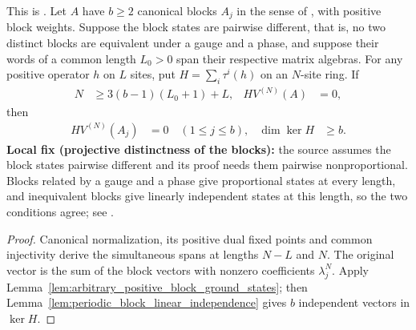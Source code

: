 \begin{theorem}
    \label{thm:canonical_arbitrary_interaction_degeneracy}
    \leanok
    This is \cite[Theorem~11]{PerezGarcia2007Matrix}. Let $A$ have $b\ge2$
    canonical blocks $A_j$ in the sense of
    \cite[Theorem~4]{PerezGarcia2007Matrix}, with positive block weights.
    Suppose the block states are pairwise different, that is, no two distinct
    blocks are equivalent under a gauge and a phase, and suppose their words of
    a common length $L_0>0$ span their respective matrix algebras. For any
    positive operator $h$ on $L$ sites, put
    $H=\sum_i\tau^i(h)$ on an $N$-site ring. If
    \begin{align}
        N & \ge3(b-1)(L_0+1)+L,
          & HV^{(N)}(A)         & =0,
        \label{eq:canonical_arbitrary_interaction_degeneracy_hypotheses}
    \end{align}
    then
    \begin{align}
        HV^{(N)}(A_j) & =0\quad(1\le j\le b),
                      & \dim\ker H            & \ge b.
        \label{eq:canonical_arbitrary_interaction_degeneracy}
    \end{align}
    \textbf{Local fix (projective distinctness of the blocks):}
    the source assumes the block states pairwise different and its proof
    needs them pairwise nonproportional. Blocks related by a gauge and a
    phase give proportional states at every length, and inequivalent blocks
    give linearly independent states at this length, so the two conditions
    agree; see \cite{gap:pgvwc07_direct_sum_input}.
\end{theorem}
\begin{proof}\leanok
    Canonical normalization, its positive dual fixed points and common
    injectivity derive the simultaneous spans at lengths $N-L$ and $N$.
    The original vector is the sum of the block vectors with nonzero
    coefficients $\lambda_j^N$. Apply
    Lemma~\ref{lem:arbitrary_positive_block_ground_states}; then
    Lemma~\ref{lem:periodic_block_linear_independence} gives $b$ independent
    vectors in $\ker H$.
\end{proof}
